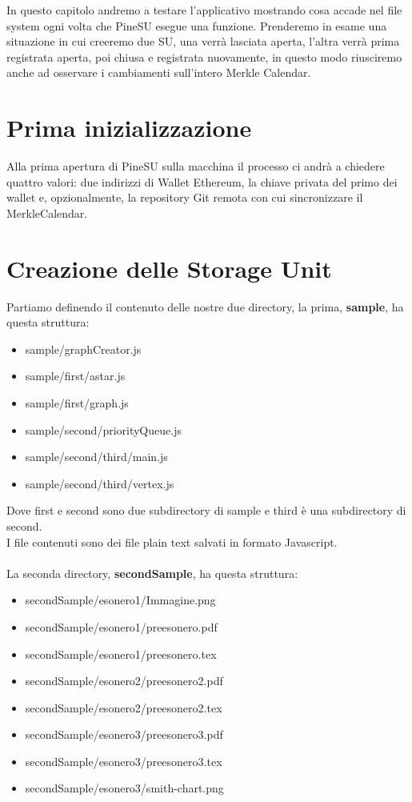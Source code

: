 In questo capitolo andremo a testare l'applicativo mostrando cosa accade nel
file system ogni volta che PineSU esegue una funzione.
Prenderemo in esame una situazione in cui creeremo due SU, una verrà lasciata aperta,
l'altra verrà prima registrata aperta, poi chiusa e registrata nuovamente, in questo modo
riusciremo anche ad osservare i cambiamenti sull'intero Merkle Calendar.

\section{Prima inizializzazione}

Alla prima apertura di PineSU sulla macchina il processo ci andrà a chiedere
quattro valori: due indirizzi di Wallet Ethereum, la chiave privata del primo dei wallet e,
opzionalmente, la repository Git remota con cui sincronizzare il MerkleCalendar.

\section{Creazione delle Storage Unit}

Partiamo definendo il contenuto delle nostre due directory, la prima,
\textbf{\textsf{sample}}, ha questa struttura:
\begin{itemize}
    \itemsep0em
    \item \textsf{sample/graphCreator.js}
    \item \textsf{sample/first/astar.js}
    \item \textsf{sample/first/graph.js}
    \item \textsf{sample/second/priorityQueue.js}
    \item \textsf{sample/second/third/main.js}
    \item \textsf{sample/second/third/vertex.js}
\end{itemize}
Dove \textsf{first} e \textsf{second} sono due subdirectory di \textsf{sample}
e \textsf{third} è una subdirectory di \textsf{second}. \\
I file contenuti sono dei file plain text salvati in formato Javascript. \\ \\
La seconda directory, \textbf{\textsf{secondSample}}, ha questa struttura:
\begin{itemize}
    \itemsep0em
    \item \textsf{secondSample/esonero1/Immagine.png}
    \item \textsf{secondSample/esonero1/preesonero.pdf}
    \item \textsf{secondSample/esonero1/preesonero.tex}
    \item \textsf{secondSample/esonero2/preesonero2.pdf}
    \item \textsf{secondSample/esonero2/preesonero2.tex}
    \item \textsf{secondSample/esonero3/preesonero3.pdf}
    \item \textsf{secondSample/esonero3/preesonero3.tex}
    \item \textsf{secondSample/esonero3/smith-chart.png}
\end{itemize}

